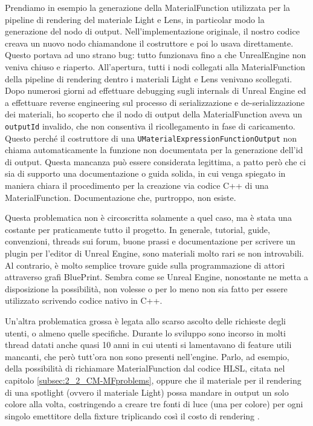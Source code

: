\documentclass[main.tex]{subfiles}
\begin{document}
Prendiamo in esempio la generazione della MaterialFunction utilizzata per la pipeline di rendering del materiale Light e Lens, in particolar modo la generazione del nodo di output. Nell'implementazione originale, il nostro codice creava un nuovo nodo chiamandone il costruttore e poi lo usava direttamente. Questo portava ad uno strano bug: tutto funzionava fino a che UnrealEngine non veniva chiuso e riaperto. All'apertura, tutti i nodi collegati alla MaterialFunction della pipeline di rendering dentro i materiali Light e Lens venivano scollegati. Dopo numerosi giorni ad effettuare debugging sugli internals di Unreal Engine ed a effettuare reverse engineering sul processo di serializzazione e de-serializzazione dei materiali, ho scoperto che il nodo di output della MaterialFunction aveva un \lstinline{outputId} invalido, che non consentiva il ricollegamento in fase di caricamento. Questo perché il costruttore di una \lstinline{UMaterialExpressionFunctionOutput} non chiama automaticamente la funzione non documentata per la generazione dell'id di output. Questa mancanza può essere considerata legittima, a patto però che ci sia di supporto una documentazione o guida solida, in cui venga spiegato in maniera chiara il procedimento per la creazione via codice C++ di una MaterialFunction. Documentazione che, purtroppo, non esiste.

Questa problematica non è circoscritta solamente a quel caso, ma è stata una costante per praticamente tutto il progetto. In generale, tutorial, guide, convenzioni, threads sui forum, buone prassi e documentazione per scrivere un plugin per l'editor di Unreal Engine, sono materiali molto rari se non introvabili. Al contrario, è molto semplice trovare guide sulla programmazione di attori attraverso grafi BluePrint. Sembra come se Unreal Engine, nonostante ne metta a disposizione la possibilità, non volesse o per lo meno non sia fatto per essere utilizzato scrivendo codice nativo in C++.
\newline

Un'altra problematica grossa è legata allo scarso ascolto delle richieste degli utenti, o almeno quelle specifiche. Durante lo sviluppo sono incorso in molti thread datati anche quasi 10 anni in cui utenti si lamentavano di feature utili mancanti, che però tutt'ora non sono presenti nell'engine. Parlo, ad esempio, della possibilità di richiamare MaterialFunction dal codice HLSL, citata nel capitolo \ref{subsec:2_2_CM-MFproblems}, oppure che il materiale per il rendering di una spotlight (ovvero il materiale Light) possa mandare in output un solo colore alla volta, costringendo a creare tre fonti di luce (una per colore) per ogni singolo emettitore della fixture triplicando così il costo di rendering \cite{rgbSpotlight}.\newline
\end{document}
